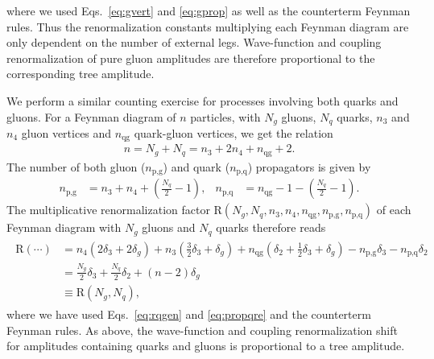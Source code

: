 where we used Eqs.~\eqref{eq:gvert} and \eqref{eq:gprop} as well as
the counterterm Feynman rules. Thus the renormalization constants
multiplying each Feynman diagram are only dependent on the number of
external legs. Wave-function
and coupling renormalization of pure gluon amplitudes are therefore
proportional to the corresponding tree
amplitude. 

We perform a similar counting exercise for processes involving both quarks and gluons. For a Feynman diagram of $n$ particles, with $N_g$ gluons, $N_q$ quarks, $n_3$ and $n_4$ gluon vertices and
$n_{\text{qg}}$ quark-gluon vertices, we get the relation
\begin{align}\label{eq:rqgen}
  n=N_g+N_q = n_3 + 2n_4 + n_{\text{qg}} +2.
\end{align}
The number of both gluon ($n_{\text{p,g}}$) and quark ($n_{\text{p,q}}$) propagators is given by
\begin{align}\label{eq:propqre}
  n_{\text{p,g}} &= n_3+n_4 + \left(\frac{N_q}{2} - 1\right), &   n_{\text{p,q}} &=
  n_{\text{qg}}-1- \left( \frac{N_q}{2} - 1\right).
\end{align}
The multiplicative renormalization factor $\text{R}(N_g,N_q,n_3,n_4,n_{\text{qg}},n_{\text{p,g}},n_{\text{p,q}})$ of each Feynman diagram with $N_g$ gluons and
$N_q$ quarks therefore reads
\begin{align}\label{eq:shiftfd}
\begin{split}
 \text{R}(\cdots) &= n_4 \left( 2\delta_3 + 2\delta_g \right) +n_3 \left(
    \frac{3}{2} \delta_3 + \delta_g \right)+n_{\text{qg}}\left(\delta_2+\frac{1}{2}\delta_3+\delta_g\right)-n_{\text{p,g}} \delta_3-n_{\text{p,q}} \delta_2\\
&=\frac{N_g}{2}\delta_3
+\frac{N_q}{2}\delta_2+\left(n-2\right)\delta_g \\
&\equiv \text{R}(N_g,N_q),
\end{split}
\end{align}
where we have used Eqs.~\eqref{eq:rqgen} and \eqref{eq:propqre} and
the counterterm Feynman rules. As above, the wave-function and coupling renormalization shift for
amplitudes containing quarks and gluons is proportional to a
tree amplitude.

